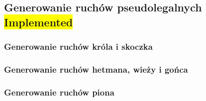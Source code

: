 \subsection{Generowanie ruchów pseudolegalnych \colorbox{yellow}{Implemented}}
\label{subsec:generowanie-ruchow-pseudolegalnych}

\subsubsection{Generowanie ruchów króla i skoczka}

\subsubsection{Generowanie ruchów hetmana, wieży i gońca}
\subsubsection{Generowanie ruchów piona}